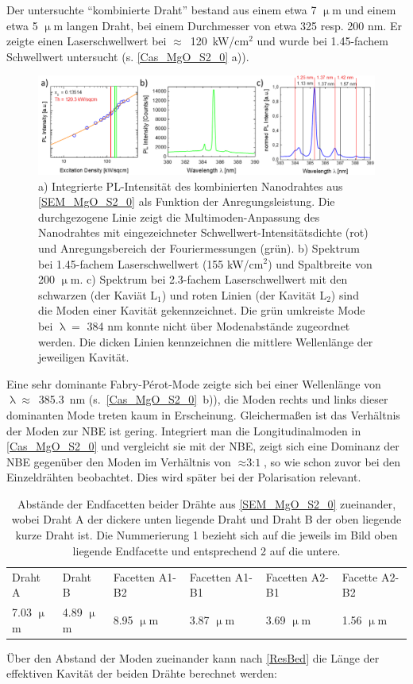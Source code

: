 Der untersuchte ``kombinierte Draht'' bestand aus einem etwa 7 $\upmu$m und einem etwa 5 $\upmu$m langen Draht, bei einem Durchmesser von etwa 325 resp. 200 nm. Er zeigte einen Laserschwellwert bei \mbox{$\approx$ 120 kW/cm$^\text{2}$} und wurde bei 1.45-fachem Schwellwert untersucht (s. \autoref{Cas_MgO_S2_0} a)).\begin{figure}[t]
\includegraphics[width=1\textwidth]{Bilder/MgO/Cas_MgO_S2_0}
\caption{a) Integrierte PL-Intensität des kombinierten Nanodrahtes aus \autoref{SEM_MgO_S2_0} als Funktion der Anregungsleistung. Die durchgezogene Linie zeigt die Multimoden-Anpassung des Nanodrahtes mit eingezeichneter Schwellwert-Intensitätsdichte (rot) und Anregungsbereich der Fouriermessungen (grün). b) Spektrum bei 1.45-fachem Laserschwellwert (155 kW/cm$^\text{2}$) und Spaltbreite von 200 $\upmu$m. c) Spektrum bei 2.3-fachem Laserschwellwert mit den schwarzen (der Kaviät L$_\text{1}$) und roten Linien (der Kavität L$_\text{2}$) sind die Moden einer Kavität gekennzeichnet. Die grün umkreiste Mode bei $\uplambda=$ 384 nm konnte nicht über Modenabstände zugeordnet werden. Die dicken Linien kennzeichnen die mittlere Wellenlänge der jeweiligen Kavität.}
\label{Cas_MgO_S2_0}
\end{figure}Eine sehr dominante Fabry-Pérot-Mode zeigte sich bei einer Wellenlänge von \mbox{$\uplambda \approx$ 385.3 nm} \mbox{(s. \autoref{Cas_MgO_S2_0} b))}, die Moden rechts und links dieser dominanten Mode treten kaum in Erscheinung. Gleichermaßen ist das Verhältnis der Moden zur NBE ist gering. Integriert man die Longitudinalmoden in \autoref{Cas_MgO_S2_0} und vergleicht sie mit der NBE, zeigt sich eine Dominanz der NBE gegenüber den Moden im Verhältnis von $\approx \text{3:1}$, so wie schon zuvor bei den Einzeldrähten beobachtet. Dies wird später bei der Polarisation relevant.
\\
\begin{table}[h]
\begin{tabular}{llllll}
Draht A & Draht B & Facetten A1-B2  & Facetten A1-B1 & Facetten A2-B1 & Facette A2-B2 \\ 
7.03 $\upmu$m & 4.89 $\upmu$m & 8.95 $\upmu$m & 3.87 $\upmu$m & 3.69 $\upmu$m & 1.56 $\upmu$m \\ 
\end{tabular}
\caption{Abstände der Endfacetten beider Drähte aus \autoref{SEM_MgO_S2_0} zueinander, wobei Draht A der dickere unten liegende Draht und Draht B der oben liegende kurze Draht ist. Die Nummerierung 1 bezieht sich auf die jeweils im Bild oben liegende Endfacette und entsprechend 2 auf die untere.}
\label{YoungDist} 
\end{table}Über den Abstand der Moden zueinander kann nach \autoref{ResBed} die Länge der effektiven Kavität der beiden Drähte berechnet werden:
